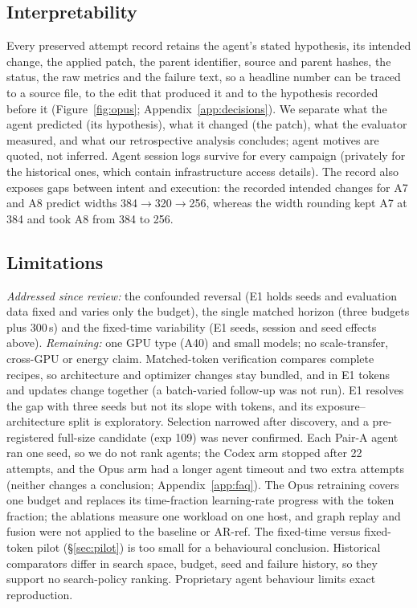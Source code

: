 \documentclass{article}
\newif\ifshowhumanmarkers \showhumanmarkersfalse
\newcommand{\humantag}[1]{{\color{humanframe}\sffamily\scriptsize\bfseries HUMAN AUTHOR MUST REWRITE/VERIFY [#1]}\ }
\newcommand{\humanauthor}[2][]{\ifshowhumanmarkers\begin{humanbox}\humantag{#1}#2\end{humanbox}\else #2\par\fi}
\begin{document}
\subsection{Interpretability}
\humanauthor[P2-13]{Every preserved attempt record retains the agent's stated hypothesis, its intended change, the applied patch, the parent identifier, source and parent hashes, the status, the raw metrics and the failure text, so a headline number can be traced to a source file, to the edit that produced it and to the hypothesis recorded before it (Figure~\ref{fig:opus}; Appendix~\ref{app:decisions}). We separate what the agent predicted (its hypothesis), what it changed (the patch), what the evaluator measured, and what our retrospective analysis concludes; agent motives are quoted, not inferred. Agent session logs survive for every campaign (privately for the historical ones, which contain infrastructure access details). The record also exposes gaps between intent and execution: the recorded intended changes for A7 and A8 predict widths 384$\to$320$\to$256, whereas the width rounding kept A7 at 384 and took A8 from 384 to 256.}

\subsection{Limitations}
\humanauthor[P2-14]{\emph{Addressed since review:} the confounded reversal (E1 holds seeds and evaluation data fixed and varies only the budget), the single matched horizon (three budgets plus 300\,s) and the fixed-time variability (E1 seeds, session and seed effects above). \emph{Remaining:} one GPU type (A40) and small models; no scale-transfer, cross-GPU or energy claim. Matched-token verification compares complete recipes, so architecture and optimizer changes stay bundled, and in E1 tokens and updates change together (a batch-varied follow-up was not run). E1 resolves the gap with three seeds but not its slope with tokens, and its exposure--architecture split is exploratory. Selection narrowed after discovery, and a pre-registered full-size candidate (exp 109) was never confirmed. Each Pair-A agent ran one seed, so we do not rank agents; the Codex arm stopped after 22 attempts, and the Opus arm had a longer agent timeout and two extra attempts (neither changes a conclusion; Appendix~\ref{app:faq}). The Opus retraining covers one budget and replaces its time-fraction learning-rate progress with the token fraction; the ablations measure one workload on one host, and graph replay and fusion were not applied to the baseline or AR-ref. The fixed-time versus fixed-token pilot (\S\ref{sec:pilot}) is too small for a behavioural conclusion. Historical comparators differ in search space, budget, seed and failure history, so they support no search-policy ranking. Proprietary agent behaviour limits exact reproduction.}
\end{document}
